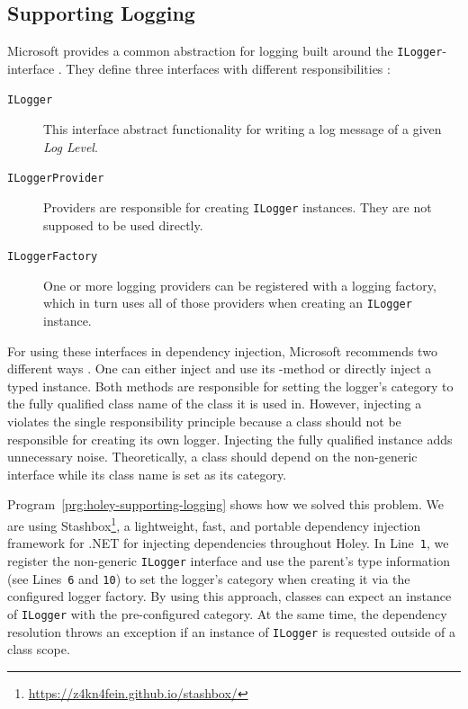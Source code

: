 \subsection{Supporting Logging}
\label{sec:holey-supporting-logging}
Microsoft provides a common abstraction for logging built around the \verb|ILogger|-interface \cite{microsoft_logging_2023}.
They define three interfaces with different responsibilities \cite{bahreini_should_2018}:
%
\begin{description}
    \item[\texttt{ILogger}] This interface abstract functionality for writing a log message of a given \emph{Log Level}.
    \item[\texttt{ILoggerProvider}] Providers are responsible for creating \verb|ILogger| instances. They are not supposed to be used directly.
    \item[\texttt{ILoggerFactory}] One or more logging providers can be registered with a logging factory, which in turn uses all of those providers when creating an \verb|ILogger| instance.
\end{description}

For using these interfaces in dependency injection, Microsoft recommends two different ways \cite{microsoft_logging_2023}.
One can either inject \texttt{} and use its \texttt{}-method or directly inject a typed \texttt{} instance.
Both methods are responsible for setting the logger's category to the fully qualified class name of the class it is used in.
However, injecting a \texttt{} violates the single responsibility principle \cite{bahreini_should_2018} because a class should not be responsible for creating its own logger.
Injecting the fully qualified \texttt{} instance adds unnecessary noise.
Theoretically, a class should depend on the non-generic interface \texttt{} while its class name is set as its category.

Program~\ref{prg:holey-supporting-logging} shows how we solved this problem.
We are using Stashbox\footnote{\url{https://z4kn4fein.github.io/stashbox/}}, a lightweight, fast, and portable dependency injection framework for .NET for injecting dependencies throughout Holey.
In Line~\verb|1|, we register the non-generic \verb|ILogger| interface and use the parent's type information (see Lines~\verb|6| and \verb|10|) to set the logger's category when creating it via the configured logger factory.
By using this approach, classes can expect an instance of \verb|ILogger| with the pre-configured category.
At the same time, the dependency resolution throws an exception if an instance of \verb|ILogger| is requested outside of a class scope.

